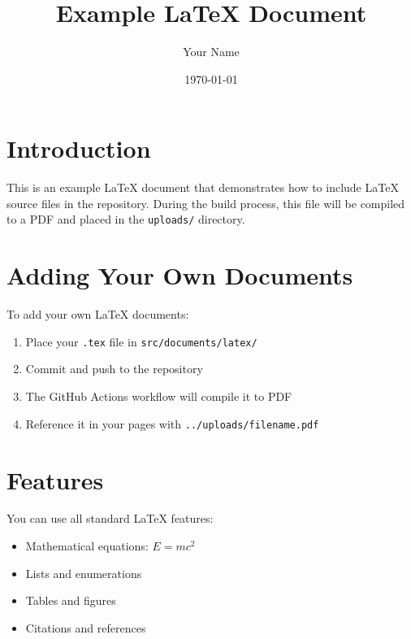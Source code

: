 \documentclass{article}
\title{Example LaTeX Document}
\author{Your Name}
\date{\today}
\begin{document}
\maketitle

\section{Introduction}

This is an example LaTeX document that demonstrates how to include LaTeX source files in the repository. During the build process, this file will be compiled to a PDF and placed in the \texttt{uploads/} directory.

\section{Adding Your Own Documents}

To add your own LaTeX documents:

\begin{enumerate}
    \item Place your \texttt{.tex} file in \texttt{src/documents/latex/}
    \item Commit and push to the repository
    \item The GitHub Actions workflow will compile it to PDF
    \item Reference it in your pages with \texttt{../uploads/filename.pdf}
\end{enumerate}

\section{Features}

You can use all standard LaTeX features:
\begin{itemize}
    \item Mathematical equations: $E = mc^2$
    \item Lists and enumerations
    \item Tables and figures
    \item Citations and references
\end{itemize}
\end{document}
